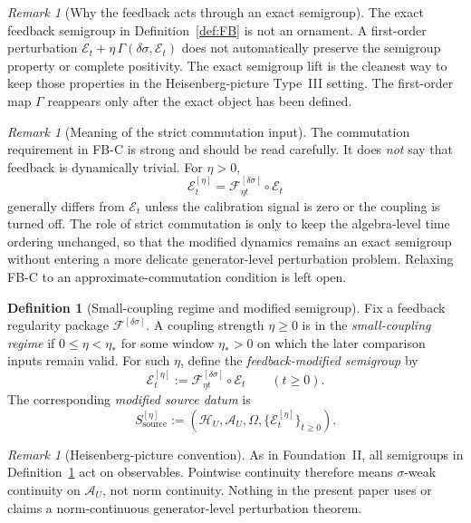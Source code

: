 \documentclass[12pt]{article}
\theoremstyle{definition}
\newtheorem{definition}[theorem]{Definition}
\theoremstyle{remark}
\newtheorem{remark}[theorem]{Remark}
\begin{document}
\begin{remark}[Why the feedback acts through an exact semigroup]
The exact feedback semigroup in Definition~\ref{def:FB} is not an
ornament. A first-order perturbation
\(\mathcal E_t+\eta\,\Gamma(\delta\sigma,\mathcal E_t)\) does not
automatically preserve the semigroup property or complete positivity.
The exact semigroup lift is the cleanest way to keep those properties in
the Heisenberg-picture Type~III setting. The first-order map
\(\Gamma\) reappears only after the exact object has been defined.
\end{remark}

\begin{remark}[Meaning of the strict commutation input]
The commutation requirement in FB-C is strong and should be read
carefully. It does \emph{not} say that feedback is dynamically trivial.
For \(\eta>0\),
\[
\mathcal E_t^{[\eta]}
=
\mathscr F_{\eta t}^{[\delta\sigma]}\circ \mathcal E_t
\]
generally differs from \(\mathcal E_t\) unless the calibration signal is
zero or the coupling is turned off. The role of strict commutation is
only to keep the algebra-level time ordering unchanged, so that the
modified dynamics remains an exact semigroup without entering a more
delicate generator-level perturbation problem. Relaxing FB-C to an
approximate-commutation condition is left open.
\end{remark}

\begin{definition}[Small-coupling regime and modified semigroup]
\label{def:modified}
Fix a feedback regularity package
\(\mathscr F^{[\delta\sigma]}\). A coupling strength \(\eta\ge0\) is in
the \emph{small-coupling regime} if \(0\le \eta < \eta_*\) for some
window \(\eta_*>0\) on which the later comparison inputs remain valid.
For such \(\eta\), define the \emph{feedback-modified semigroup} by
\[
\mathcal E_t^{[\eta]}
:=
\mathscr F_{\eta t}^{[\delta\sigma]}\circ \mathcal E_t
\qquad
(t\ge0).
\]
The corresponding \emph{modified source datum} is
\[
S_{\mathrm{source}}^{[\eta]}
:=
(\mathcal H_U,\mathcal A_U,\Omega,\{\mathcal E_t^{[\eta]}\}_{t\ge0}).
\]
\end{definition}

\begin{remark}[Heisenberg-picture convention]
As in Foundation~II, all semigroups in Definition~\ref{def:modified}
act on observables. Pointwise continuity therefore means
\(\sigma\)-weak continuity on \(\mathcal A_U\), not norm continuity.
Nothing in the present paper uses or claims a norm-continuous
generator-level perturbation theorem.
\end{remark}
\end{document}
